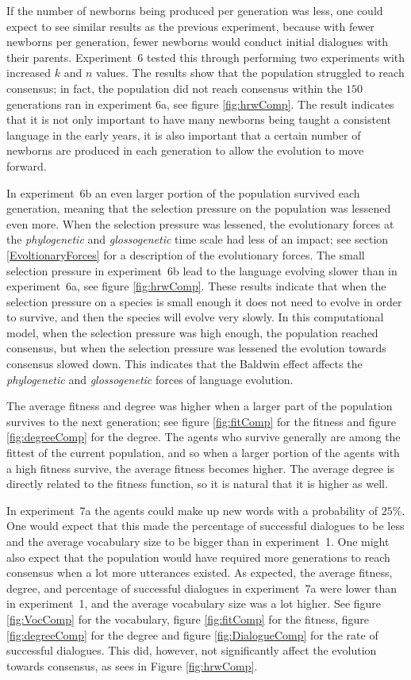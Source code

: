 If the number of newborns being produced per generation was less, one could expect to see similar results as the previous experiment, because with fewer newborns per generation, fewer newborns would conduct initial dialogues with their parents. Experiment~6 tested this through performing two experiments with increased $k$ and $n$ values. The results show that the population struggled to reach consensus; in fact, the population did not reach consensus within the $150$ generations ran in experiment 6a, see figure \ref{fig:hrwComp}. The result indicates that it is not only important to have many newborns being taught a consistent language in the early years, it is also important that a certain number of newborns are produced in each generation to allow the evolution to move forward. 

In experiment~6b an even larger portion of the population survived each generation, meaning that the selection pressure on the population was lessened even more. When the selection pressure was lessened, the evolutionary forces at the \textit{phylogenetic} and \textit{glossogenetic} time scale had less of an impact; see section \ref{EvoltionaryForces} for a description of the evolutionary forces. The small selection pressure in experiment~6b lead to the language evolving slower than in experiment~6a, see figure \ref{fig:hrwComp}. These results indicate that when the selection pressure on a species is small enough it does not need to evolve in order to survive, and then the species will evolve very slowly. In this computational model, when the selection pressure was high enough, the population reached consensus, but when the selection pressure was lessened the evolution towards consensus slowed down. This indicates that the Baldwin effect affects the \textit{phylogenetic} and \textit{glossogenetic} forces of language evolution. 

The average fitness and degree was higher when a larger part of the population survives to the next generation; see figure \ref{fig:fitComp} for the fitness and figure \ref{fig:degreeComp} for the degree. The agents who survive generally are among the fittest of the current population, and so when a larger portion of the agents with a high fitness survive, the average fitness becomes higher. The average degree is directly related to the fitness function, so it is natural that it is higher as well. 

In experiment~7a the agents could make up new words with a probability of $25\%$. One would expect that this made the percentage of successful dialogues to be less and the average vocabulary size to be bigger than in experiment~1. One might also expect that the population would have required more generations to reach consensus when a lot more utterances existed. As expected, the average fitness, degree, and percentage of successful dialogues in experiment~7a were lower than in experiment~1, and the average vocabulary size was a lot higher. See figure \ref{fig:VocComp} for the vocabulary, figure \ref{fig:fitComp} for the fitness, figure \ref{fig:degreeComp} for the degree and figure \ref{fig:DialogueComp} for the rate of successful dialogues. This did, however, not significantly affect the evolution towards consensus, as sees in Figure \ref{fig:hrwComp}. 

